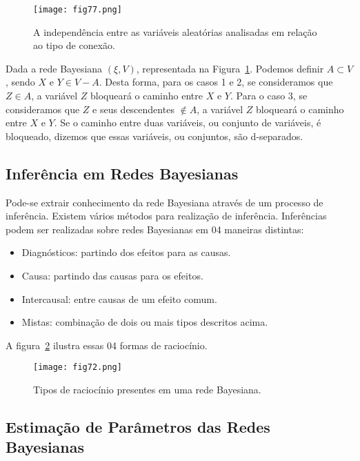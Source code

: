 \begin{figure}[t]
    \texttt{[image: fig77.png]}
    \centering
    \caption{A independência entre as variáveis aleatórias analisadas em relação ao tipo de conexão.}
    \label{fig:fig77}
\end{figure}

Dada a rede Bayesiana $(\xi, V)$, representada na Figura~\ref{fig:fig77}. Podemos definir $A \subset V$, sendo $X$ e $Y \in V - A$. Desta forma, para os casos 1 e 2, se consideramos que $Z \in A$, a variável $Z$ bloqueará o caminho entre $X$ e $Y$. Para o caso 3, se consideramos que $Z$ e seus descendentes $\notin A$, a variável $Z$ bloqueará o caminho entre $X$ e $Y$. Se o caminho entre duas variáveis, ou conjunto de variáveis, é bloqueado, dizemos que essas variáveis, ou conjuntos, são d-separados.

\subsection{Inferência em Redes Bayesianas}

Pode-se extrair conhecimento da rede Bayesiana através de um processo de inferência. Existem vários métodos para realização de inferência. Inferências podem ser realizadas sobre redes Bayesianas em 04 maneiras distintas:

\begin{itemize}
    \item Diagnósticos: partindo dos efeitos para as causas.
    \item Causa: partindo das causas para os efeitos.
    \item Intercausal: entre causas de um efeito comum.
    \item Mistas: combinação de dois ou mais tipos descritos acima.
\end{itemize}

A figura~\ref{fig:fig72} ilustra essas 04 formas de raciocínio.

\begin{figure}[t]
    \texttt{[image: fig72.png]}
    \centering
    \caption{Tipos de raciocínio presentes em uma rede Bayesiana.}
    \label{fig:fig72}
\end{figure}

\subsection{Estimação de Parâmetros das Redes Bayesianas}


